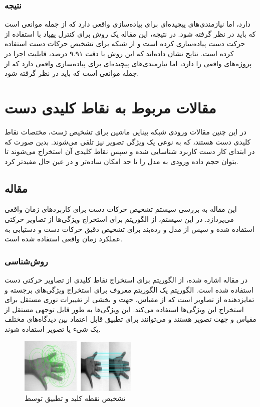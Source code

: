 \subsubsection{نتیجه}
دارد، اما نیازمندی‌های پیچیده‌ای برای پیاده‌سازی واقعی دارد که از جمله موانعی است که باید در نظر گرفته شود.
در نتیجه، این مقاله یک روش برای کنترل پهپاد با استفاده از حرکت دست پیاده‌سازی کرده است و از شبکه 
برای تشخیص حرکات دست استفاده کرده است. نتایج نشان داده‌اند که این روش با دقت ۹.۹۱ درصد، قابلیت اجرا در پروژه‌های واقعی را دارد، اما نیازمندی‌های پیچیده‌ای برای پیاده‌سازی واقعی دارد که از جمله موانعی است که باید در نظر گرفته شود.
\cite{perera2018uav}




\section{مقالات مربوط به نقاط کلیدی دست}
در این چنین مقالات ورودی شبکه بینایی ماشین برای تشخیص ژست، مختصات نقاط کلیدی دست هستند، که به نوعی یک ویژگی تصویر نیز تلقی می‌شوند. بدین صورت که در ابتدای کار دست کاربرد شناسایی شده و سپس نقاط کلیدی آن استخراج می‌شوند تا بتوان حجم داده ورودی به مدل را تا حد امکان ساده‌تر و در عین حال مفیدتر کرد.

\subsection{مقاله }
این مقاله به بررسی سیستم تشخیص حرکات دست برای کاربردهای زمان واقعی می‌پردازد. در این سیستم، از الگوریتم  برای استخراج ویژگی‌ها از تصاویر
حرکتی استفاده شده و سپس از مدل  و رده‌بند  برای تشخیص دقیق حرکات دست و دستیابی به عملکرد زمان واقعی استفاده شده است.

\subsubsection{روش‌شناسی}
در مقاله اشاره شده، از الگوریتم  برای استخراج نقاط کلیدی از تصاویر حرکتی دست استفاده شده است. الگوریتم  یک الگوریتم معروف برای استخراج ویژگی‌های برجسته 
و تمایزدهنده از تصاویر است که از مقیاس، جهت و بخشی از تغییرات نوری مستقل برای استخراج این ویژگی‌ها استفاده می‌کند. این ویژگی‌ها به طور قابل توجهی مستقل از 
مقیاس و جهت تصویر هستند و می‌توانند برای تطبیق قابل اعتماد بین دیدگاه‌های مختلف یک شیء یا تصویر استفاده شوند.

\begin{figure}[h]
    \centering
    \includegraphics[width=0.5\textwidth]{SIFT.png}
    \caption{تشخیص نقطه کلید و تطبیق توسط }
\end{figure}

